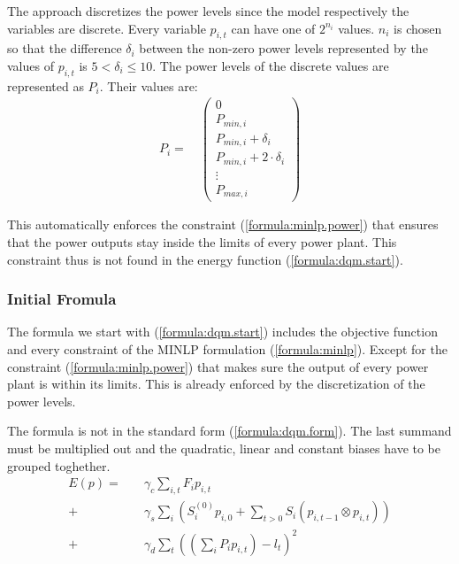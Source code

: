 The approach discretizes the power levels since the model respectively the variables are discrete.
Every variable $p_{i, t}$ can have one of $2^{n_i}$ values.
$n_i$ is chosen so that the difference $\delta_i$ between the non-zero power levels represented by the values of $p_{i, t}$ is $5 < \delta_i \leq 10$.
The power levels of the discrete values are represented as $P_i$.
Their values are:
\begin{align}
  P_i =
  \quad \begin{pmatrix}
    0 \\
    P_{min, i} \\
    P_{min, i} + \delta_i \\
    P_{min, i} + 2 \cdot \delta_i \\
    \vdots \\
    P_{max, i}
  \end{pmatrix}
\end{align}

This automatically enforces the constraint (\ref{formula:minlp.power}) that ensures that the power outputs stay inside the limits of every power plant.
This constraint thus is not found in the energy function (\ref{formula:dqm.start}).

\subsubsection{Initial Fromula}
\label{approach:annealing.formulate}

The formula we start with (\ref{formula:dqm.start}) includes the objective function and every constraint of the MINLP formulation (\ref{formula:minlp}).
Except for the constraint (\ref{formula:minlp.power}) that makes sure the output of every power plant is within its limits.
This is already enforced by the discretization of the power levels.

The formula is not in the standard form (\ref{formula:dqm.form}).
The last summand must be multiplied out and the quadratic, linear and constant biases have to be grouped toghether.
\begin{subequations}
\begin{align}
  E(p) =
  &  \quad \gamma_c \sum_{i, t} F_i p_{i, t}
  \label{formula:dqm.start.obj} \\
  + & \quad \gamma_s \sum_i \left(
      S_i^{(0)} p_{i, 0}
      + \sum_{t > 0} S_i \left( p_{i, t-1} \otimes p_{i, t} \right)
    \right)
  \label{formula:dqm.start.startup} \\
  + & \quad \gamma_d \sum_t \left( \left( \sum_i P_i p_{i, t} \right) - l_t \right)^2
  \label{formula:dqm.start.demand}
\end{align}
\label{formula:dqm.start}
\end{subequations}

